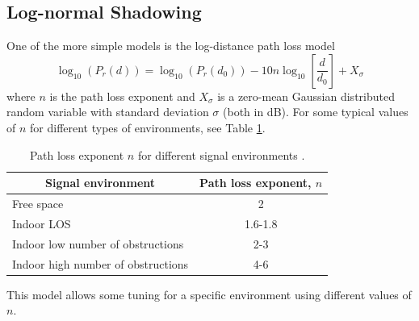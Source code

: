 \documentclass{LTHthesis}
\begin{document}
\subsection{Log-normal Shadowing} 
One of the more simple models is the log-distance path loss model
%
\begin{equation}
\log_{10}({P_r(d)})=\log_{10}({P_r(d_0)})-10n\log_{10}\left[{\frac{d}{d_0}}\right] + X_\sigma
\end{equation} 
%
where $n$ is the path loss exponent and  $X_\sigma$ is a zero-mean Gaussian distributed random variable with standard deviation $\sigma$ (both in dB). For some typical values of $n$ for different types of environments, see Table \ref{table:path_loss_n}.
%
\begin{table}
\begin{center}
\begin{tabular}{| l | c |}
\hline
\multicolumn{1}{|c|}{Signal environment} & Path loss exponent, $n$ \\
\hline
\hline
Free space & 2 \\
\hline
Indoor LOS & 1.6-1.8 \\
\hline
Indoor low number of obstructions & 2-3 \\
\hline
Indoor high number of obstructions & 4-6 \\
\hline
\end{tabular}
\end{center}
\caption{Path loss exponent $n$ for different signal environments \cite{rappaport96}.}
\label{table:path_loss_n}
\end{table}
%
This model allows some tuning for a specific environment using different values of $n$.
\end{document}
